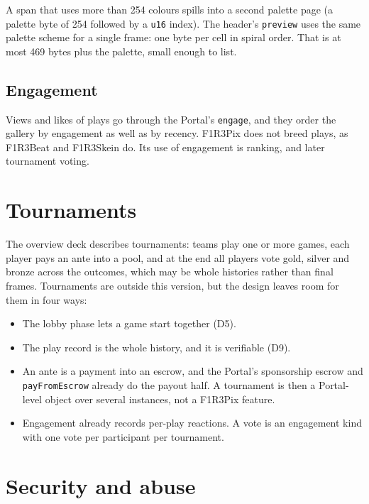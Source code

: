 \documentclass[11pt,a4paper]{article}
\newcommand{\code}[1]{\texttt{#1}}
\begin{document}
A span that uses more than 254 colours spills into a second palette page (a palette byte of 254
followed by a \code{u16} index). The header's \code{preview} uses the same palette scheme for a
single frame: one byte per cell in spiral order. That is at most 469 bytes plus the palette,
small enough to list.

\subsection{Engagement}

Views and likes of plays go through the Portal's \code{engage}, and they order the gallery by
engagement as well as by recency. F1R3Pix does not breed plays, as F1R3Beat and F1R3Skein do.
Its use of engagement is ranking, and later tournament voting.

\section{Tournaments}\label{sec:tournaments}

The overview deck describes tournaments: teams play one or more games, each player pays an ante
into a pool, and at the end all players vote gold, silver and bronze across the outcomes, which
may be whole histories rather than final frames. Tournaments are outside this version, but the
design leaves room for them in four ways:

\begin{itemize}[leftmargin=1.2em,itemsep=1pt]
\item The lobby phase lets a game start together (D5).
\item The play record is the whole history, and it is verifiable (D9).
\item An ante is a payment into an escrow, and the Portal's sponsorship escrow and
  \code{payFromEscrow} already do the payout half. A tournament is then a Portal-level object
  over several instances, not a F1R3Pix feature.
\item Engagement already records per-play reactions. A vote is an engagement kind with one vote
  per participant per tournament.
\end{itemize}

\section{Security and abuse}\label{sec:security}
\end{document}
